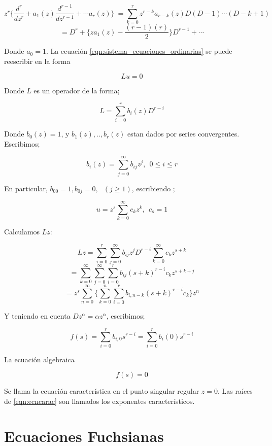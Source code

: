 $$ z^{r} \lbrace \frac{d^{r}}{dz^{r}} + a_{1}(z) \frac{d^{r-1}}{dz^{r-1}} + \cdots a_{r}(z) \rbrace \
= \sum_{k=0}^{r} z^{r-k}a_{r-k}(z)D(D-1) \cdots (D-k+1) \ $$
$$=D^{r} + \lbrace za_{1}(z) - \frac{(r-1)(r)}{2} \rbrace D^{r-1} + \cdots $$

Donde $a_{0}=1$.
La ecuaci\'on \ref{eqn:sistema_ecuaciones_ordinarias} se puede reescribir en la forma

$$ Lu=0 $$

Donde $L$ es un operador de la forma;

$$ L= \sum_{i=0}^{r} b_{i}(z) D^{r-i}$$

Donde $b_{0}(z) = 1$, y $b_{1}(z),..,b_{r}(z) $ estan dados por series convergentes. Escribimos;

\begin{equation}
  b_{i}(z)=\sum_{j=0}^{\infty} b_{ij}z^{j}, \ \  0 \leq i \leq r
\end{equation}

En particular, $b_{00}= 1, b_{0j}=0, \ \ \ (j \geq 1)$, escribiendo ;

$$ u= z^{s} \sum_{k=0}^{\infty} c_{k} z^{k}, \ \ c_{o}=1$$

Calculamos $Lz$:

$$Lz = \sum_{i=0}^{r} \sum_{j=0}^{\infty} b_{ij} z^{j} D^{r-i} \sum_{k=0}^{\infty} c_{k} z ^{s+k}$$
$$= \sum_{k=0}^{\infty} \sum_{j=0}^{\infty} \sum_{i=0}^{r} b_{ij} (s+k)^{r-i}c_{k}z^{s+k+j}$$
$$= z^{s} \sum_{n=0}^{\infty} \lbrace \sum_{k=0}^{n} \sum_{i=0}^{r}  b_{i,n-k}(s+k)^{r-i}c_{k} \rbrace z^{n} $$

Y teniendo en cuenta $Dz^{\alpha} = \alpha z^{\alpha}$, escribimos;

$$f(s) = \sum_{i=0}^{r} b_{i,0}s^{r-i} = \sum_{i=0}^{r} b_{i}(0) s^{r-i}$$

\begin{defn} La ecuaci\'on algebraica

 \begin{equation} \label{eqn:ecncarac} f(s)=0 \end{equation}

Se llama la ecuaci\'on caracter\'istica en el punto singular regular $z=0$. Las ra\'ices de \ref{eqn:ecncarac}  son llamados los exponentes caracter\'isticos.
\end{defn}

\section{ Ecuaciones Fuchsianas }

